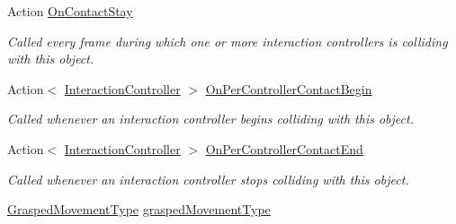 \begin{DoxyCompactItemize}
Action \mbox{\hyperlink{class_leap_1_1_unity_1_1_interaction_1_1_interaction_behaviour_a3c7b7197c53f70e06444f114d4cf7a1e}{On\+Contact\+Stay}}
\begin{DoxyCompactList}\small\item\em Called every frame during which one or more interaction controllers is colliding with this object. \end{DoxyCompactList}\item 
Action$<$ \mbox{\hyperlink{class_leap_1_1_unity_1_1_interaction_1_1_interaction_controller}{Interaction\+Controller}} $>$ \mbox{\hyperlink{class_leap_1_1_unity_1_1_interaction_1_1_interaction_behaviour_a4c5c4aba2acc37dcdab1d22ce35ed742}{On\+Per\+Controller\+Contact\+Begin}}
\begin{DoxyCompactList}\small\item\em Called whenever an interaction controller begins colliding with this object. \end{DoxyCompactList}\item 
Action$<$ \mbox{\hyperlink{class_leap_1_1_unity_1_1_interaction_1_1_interaction_controller}{Interaction\+Controller}} $>$ \mbox{\hyperlink{class_leap_1_1_unity_1_1_interaction_1_1_interaction_behaviour_af7f796779bae4595c69e4379bf7158ec}{On\+Per\+Controller\+Contact\+End}}
\begin{DoxyCompactList}\small\item\em Called whenever an interaction controller stops colliding with this object. \end{DoxyCompactList}\item 
\mbox{\hyperlink{class_leap_1_1_unity_1_1_interaction_1_1_interaction_behaviour_a800262cc3a5c425a4816b60fae89c307}{Grasped\+Movement\+Type}} \mbox{\hyperlink{class_leap_1_1_unity_1_1_interaction_1_1_interaction_behaviour_a56a2792d6c9900291188d3df0c6a92e5}{grasped\+Movement\+Type}}
\end{DoxyCompactItemize}
